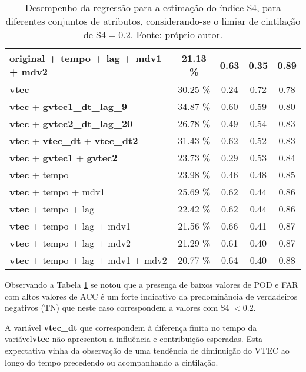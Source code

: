 \begin{table}
\begin{center}
\begin{tabular}{|l|c|c|c|c|}
original + tempo + lag + mdv1 + mdv2	         & 21.13 \%	&0.63 & 	0.35 &  0.89 \\ \hline
{\bf vtec}	                                     & 30.25 \%	&0.24 & 	0.72 &  0.78 \\ \hline
{\bf vtec} + {\bf gvtec1\_dt\_lag\_9}            & 34.87 \% &0.60 &     0.59 &  0.80 \\ \hline
{\bf vtec} + {\bf gvtec2\_dt\_lag\_20}           & 26.78 \% &0.49 &     0.54 &  0.83 \\ \hline
{\bf vtec} + {\bf vtec\_dt} + {\bf vtec\_dt2}    & 31.43 \%	&0.62 & 	0.52 &  0.83 \\ \hline
{\bf vtec} + {\bf gvtec1} + {\bf gvtec2}         & 23.73 \%	&0.29 & 	0.53 &  0.84 \\ \hline
{\bf vtec} + tempo	                             & 23.98 \%	&0.46 & 	0.48 &  0.85 \\ \hline
{\bf vtec} + tempo + mdv1	                     & 25.69 \%	&0.62 & 	0.44 &  0.86 \\ \hline
{\bf vtec} + tempo + lag	                     & 22.42 \%	&0.62 & 	0.44 &  0.86 \\ \hline
{\bf vtec} + tempo + lag + mdv1	                 & 21.56 \%	&0.66 & 	0.41 &  0.87 \\ \hline
{\bf vtec} + tempo + lag + mdv2	                 & 21.29 \%	&0.61 & 	0.40 &  0.87 \\ \hline
{\bf vtec} + tempo + lag + mdv1 + mdv2	         & 20.77 \%	&0.64 & 	0.40 &  0.88 \\ \hline
\end{tabular}
\end{center}
\vspace{12pt}
\caption{Desempenho da regressão para a estimação do índice S4, para diferentes conjuntos de atributos, considerando-se o limiar de cintilação de S4$=0.2$. Fonte: próprio autor.}
\label{tab:final_result}
\end{table}

Observando a Tabela \ref{tab:final_result} se notou que a presença de baixos valores de POD e FAR com altos valores de ACC é um forte indicativo da predominância de verdadeiros negativos (TN) que neste caso correspondem a valores com S4 $<0.2$.

A variável {\bf vtec\_dt} que correspondem à diferença finita no tempo da variável{\bf vtec} não apresentou a influência e contribuição esperadas. Esta expectativa vinha da observação de uma tendência de diminuição do VTEC ao longo do tempo precedendo ou acompanhando a cintilação.

